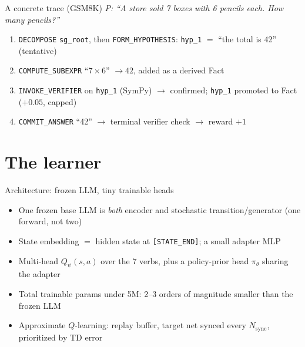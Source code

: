 \documentclass[aspectratio=169]{beamer}
\newcommand{\pitheta}{\pi_\theta}
\newcommand{\Qpsi}{Q_\psi}
\newcommand{\verbword}[1]{\texttt{#1}}
\begin{document}
\begin{frame}{A concrete trace (GSM8K)}
  \small
  \textit{P: ``A store sold 7 boxes with 6 pencils each. How many pencils?''}
  \begin{enumerate}
    \item \verbword{DECOMPOSE} \texttt{sg\_root}, then \verbword{FORM\_HYPOTHESIS}: \texttt{hyp\_1} $=$ ``the total is 42'' (tentative)
    \item \verbword{COMPUTE\_SUBEXPR} ``$7\times 6$'' $\to 42$, added as a derived Fact
    \item \verbword{INVOKE\_VERIFIER} on \texttt{hyp\_1} (SymPy) $\to$ confirmed; \texttt{hyp\_1} promoted to Fact ($+0.05$, capped)
    \item \verbword{COMMIT\_ANSWER} ``42'' $\to$ terminal verifier check $\to$ reward $+1$
  \end{enumerate}
\end{frame}

\section{The learner}

\begin{frame}{Architecture: frozen LLM, tiny trainable heads}
  \begin{itemize}
    \item One frozen base LLM is \emph{both} encoder and stochastic transition/generator (one forward, not two)
    \item State embedding $=$ hidden state at \verbword{[STATE\_END]}; a small adapter MLP
    \item Multi-head $\Qpsi(s,a)$ over the 7 verbs, plus a policy-prior head $\pitheta$ sharing the adapter
    \item Total trainable params \alert{under 5M}: 2--3 orders of magnitude smaller than the frozen LLM
    \item Approximate $Q$-learning: replay buffer, target net synced every $N_{\mathrm{sync}}$, prioritized by TD error
  \end{itemize}
\end{frame}
\end{document}
